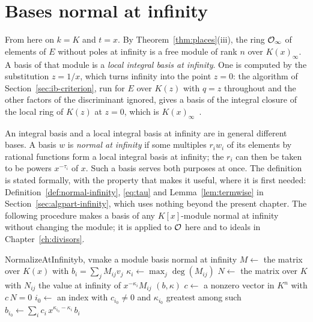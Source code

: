\section{Bases normal at infinity}\label{sec:ib-infinity}

From here on $k = K$ and $t = x$. By Theorem~\ref{thm:places}(iii), the ring
$\mathcal{O}_\infty$ of elements of $E$ without poles at infinity is a free module of
rank $n$ over $K(x)_\infty$. A basis of that module is a \emph{local integral
basis at infinity}. One is computed by the substitution $z = 1/x$, which
turns infinity into the point $z = 0$: the algorithm of
Section~\ref{sec:ib-criterion}, run for $E$ over $K(z)$ with $q = z$
throughout and the other factors of the discriminant ignored, gives a basis
of the integral closure of the local ring of $K(z)$ at $z = 0$, which is
$K(x)_\infty$~\cite[\S2.3]{trager1984}.

An integral basis and a local integral basis at infinity are in general
different bases. A basis $w$ is \emph{normal at infinity} if some multiples
$r_i w_i$ of its elements by rational functions form a local integral basis
at infinity; the $r_i$ can then be taken to be powers $x^{-\tau_i}$ of $x$.
Such a basis serves both purposes at once. The definition is stated
formally, with the property that makes it useful, where it is first needed:
Definition~\ref{def:normal-infinity}, \eqref{eq:tau} and
Lemma~\ref{lem:termwise} in Section~\ref{sec:algpart-infinity}, which uses
nothing beyond the present chapter. The following procedure makes a basis of any $K[x]$-module
normal at infinity without changing the module; it is applied to $\mathcal{O}$ here
and to ideals in Chapter~\ref{ch:divisors}.

\begin{algo}{NormalizeAtInfinity}{b, v}{make a module basis normal at infinity}
\Loop
  \State $M \gets$ the matrix over $K(x)$ with $b_i = \sum_j M_{ij} v_j$
    \State $\kappa_i \gets \max_j \deg(M_{ij})$
  \EndFor
  \State $N \gets$ the matrix over $K$ with $N_{ij}$ the value at infinity of $x^{-\kappa_i} M_{ij}$
   \Return $(b, \kappa)$ \EndIf
  \State $c \gets$ a nonzero vector in $K^n$ with $c\, N = 0$
  \State $i_0 \gets$ an index with $c_{i_0} \ne 0$ and $\kappa_{i_0}$ greatest among such
  \State $b_{i_0} \gets \sum_i c_i\, x^{\kappa_{i_0} - \kappa_i}\, b_i$ 
\EndLoop
\end{algo}

